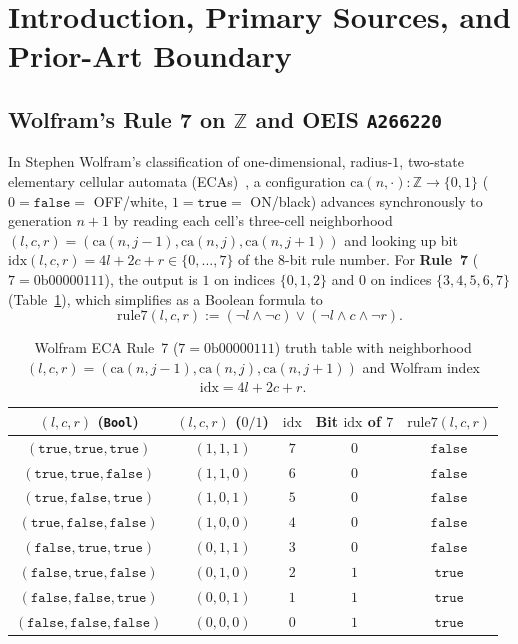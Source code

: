 \documentclass[11pt]{article}
\theoremstyle{definition}
\newcommand{\Z}{\mathbb{Z}}
\newcommand{\seq}[1]{\texttt{#1}}
\newcommand{\ca}{\mathrm{ca}}
\newcommand{\ruleSeven}{\mathrm{rule7}}
\newcommand{\btrue}{\mathtt{true}}
\newcommand{\bfalse}{\mathtt{false}}
\begin{document}
\section{Introduction, Primary Sources, and Prior-Art Boundary}

\subsection{Wolfram's Rule 7 on \texorpdfstring{$\Z$}{Z} and OEIS \texorpdfstring{\seq{A266220}}{A266220}}

In Stephen Wolfram's classification of one-dimensional, radius-$1$, two-state elementary cellular automata (ECAs)~\cite{wolfram2002}, a configuration $\ca(n, \cdot) : \Z \to \{0, 1\}$ ($0 = \bfalse =$ OFF/white, $1 = \btrue =$ ON/black) advances synchronously to generation $n + 1$ by reading each cell's three-cell neighborhood $(l, c, r) = (\ca(n, j - 1), \ca(n, j), \ca(n, j + 1))$ and looking up bit $\mathrm{idx}(l, c, r) = 4l + 2c + r \in \{0, \dots, 7\}$ of the $8$-bit rule number. For \textbf{Rule~7} ($7 = 0\mathrm{b}00000111$), the output is $1$ on indices $\{0, 1, 2\}$ and $0$ on indices $\{3, 4, 5, 6, 7\}$ (Table~\ref{tab:rule7}), which simplifies as a Boolean formula to
\begin{equation}
\label{eq:rule7}
\ruleSeven(l, c, r) := (\neg l \land \neg c) \lor (\neg l \land c \land \neg r).
\end{equation}

\begin{table}[ht]
\centering
\caption{Wolfram ECA Rule~7 ($7 = 0\mathrm{b}00000111$) truth table with neighborhood $(l, c, r) = (\ca(n, j - 1), \ca(n, j), \ca(n, j + 1))$ and Wolfram index $\mathrm{idx} = 4l + 2c + r$.}
\label{tab:rule7}
\smallskip
{\small
\begin{tabular}{@{}ccccc@{}}
\toprule
$(l, c, r)$ (\texttt{Bool}) & $(l, c, r)$ ($0/1$) & $\mathrm{idx}$ & Bit $\mathrm{idx}$ of $7$ & $\ruleSeven(l, c, r)$ \\
\midrule
$(\btrue, \btrue, \btrue)$   & $(1, 1, 1)$ & $7$ & $0$ & $\bfalse$ \\
$(\btrue, \btrue, \bfalse)$  & $(1, 1, 0)$ & $6$ & $0$ & $\bfalse$ \\
$(\btrue, \bfalse, \btrue)$  & $(1, 0, 1)$ & $5$ & $0$ & $\bfalse$ \\
$(\btrue, \bfalse, \bfalse)$ & $(1, 0, 0)$ & $4$ & $0$ & $\bfalse$ \\
$(\bfalse, \btrue, \btrue)$  & $(0, 1, 1)$ & $3$ & $0$ & $\bfalse$ \\
$(\bfalse, \btrue, \bfalse)$ & $(0, 1, 0)$ & $2$ & $1$ & $\btrue$  \\
$(\bfalse, \bfalse, \btrue)$ & $(0, 0, 1)$ & $1$ & $1$ & $\btrue$  \\
$(\bfalse, \bfalse, \bfalse)$& $(0, 0, 0)$ & $0$ & $1$ & $\btrue$  \\
\bottomrule
\end{tabular}
}
\end{table}
\end{document}
